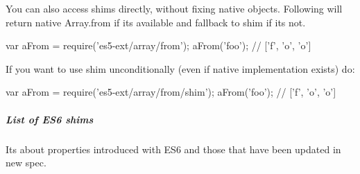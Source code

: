You can also access shims directly, without fixing native objects. Following will return native {\ttfamily Array.\+from} if it\textquotesingle{}s available and fallback to shim if it\textquotesingle{}s not.


\begin{DoxyCode}
var aFrom = require('es5-ext/array/from');
aFrom('foo'); // ['f', 'o', 'o']
\end{DoxyCode}


If you want to use shim unconditionally (even if native implementation exists) do\+:


\begin{DoxyCode}
var aFrom = require('es5-ext/array/from/shim');
aFrom('foo'); // ['f', 'o', 'o']
\end{DoxyCode}


\subparagraph*{List of E\+S6 shims}

It\textquotesingle{}s about properties introduced with E\+S6 and those that have been updated in new spec.



